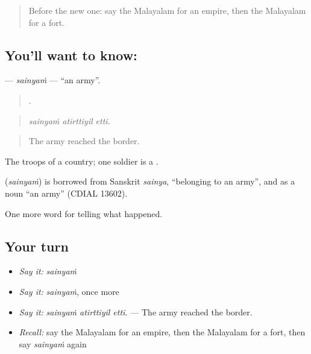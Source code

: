 \label{lesson:ML-C399-sainyam}



\begin{quote}
Before the new one: say the Malayalam for an empire, then the Malayalam for a fort.
\end{quote}

\subsection*{You'll want to know: }
\textbf{} — \emph{sainyaṁ} — \textquotedblleft{}an army\textquotedblright{}.

\begin{quote}
  .
\end{quote}

\begin{quote}
\emph{sainyaṁ atirttiyil etti.}
\end{quote}

\begin{quote}
The army reached the border.
\end{quote}

The troops of a country; one soldier is a .

\begin{cousinweb}
\textbf{} (\emph{sainyaṁ}) is borrowed from Sanskrit \emph{sainya}, \textquotedblleft{}belonging to an army\textquotedblright{}, and as a noun \textquotedblleft{}an army\textquotedblright{} (CDIAL 13602).
\end{cousinweb}

\begin{grammarlens}[title={What you've built}]
One more word for telling what happened.
\end{grammarlens}

\subsection*{Your turn}
\begin{itemize}
\raggedright
  \item \emph{Say it:} \emph{sainyaṁ}
  \item \emph{Say it:} \emph{sainyaṁ}, once more
  \item \emph{Say it:} \emph{sainyaṁ atirttiyil etti.} — The army reached the border.
  \item \emph{Recall:} say the Malayalam for an empire, then the Malayalam for a fort, then say \emph{sainyaṁ} again
\end{itemize}

